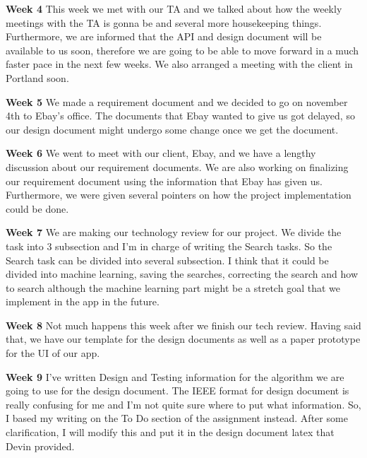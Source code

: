 \documentclass[journal,compsoc, 10pt, draftclsnofoot, onecolumn]{IEEEtran}
\begin{document}
\textbf{Week 4}\newline
This week we met with our TA and we talked about how the weekly meetings with the 
TA is gonna be and several more housekeeping things. Furthermore, we are 
informed that the API and design document will be available to us soon, therefore 
we are going to be able to move forward in a much faster pace in the next few
 weeks. We also arranged a meeting with the client in Portland soon.
\newline

\textbf{Week 5}\newline
We made a requirement document and we decided to go on november 4th to 
Ebay's office. The documents that Ebay wanted to give us got delayed, so our 
design document might undergo some change once we get the document.\newline

\textbf{Week 6}\newline
We went to meet with our client, Ebay, and we have a lengthy discussion about
 our requirement documents. We are also working on finalizing our requirement 
 document using the information that Ebay has given us. Furthermore, we were
  given several pointers on how the project implementation could be done.\newline

\textbf{Week 7}\newline
We are making our technology review for our project. We divide the task into 3 
subsection and I'm in charge of writing the Search tasks. So the Search task can 
be divided into several subsection. I think that it could be divided into machine 
learning, saving the searches, correcting the search and how to search although 
the machine learning part might be a stretch goal that we implement in the app 
in the future.\newline

\textbf{Week 8}\newline
Not much happens this week after we finish our tech review. Having said that, 
we have our template for the design documents as well as a paper prototype 
for the UI of our app.\newline

\textbf{Week 9}\newline
I've written Design and Testing information for the algorithm we are going to 
use for the design document. The IEEE format for design document is really 
confusing for me and I'm not quite sure where to put what information. So, 
I based my writing on the To Do section of the assignment instead. After 
some clarification, I will modify this and put it in the design document latex 
that Devin provided.\newline
\end{document}

